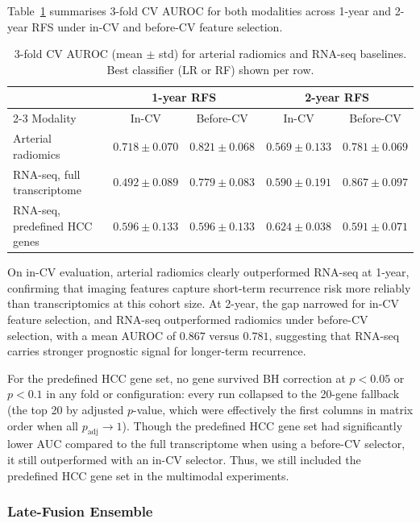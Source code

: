 \documentclass[12pt,twoside]{report}
\begin{document}
Table~\ref{tab:baselines} summarises 3-fold CV AUROC for both modalities across 1-year and 2-year RFS
under in-CV and before-CV feature selection.

\begin{table}[H]
\centering
\small
\caption{3-fold CV AUROC (mean $\pm$ std) for arterial radiomics and RNA-seq baselines. Best classifier (LR or RF) shown per row.}
\label{tab:baselines}
\begin{tabular}{lcccc}
\hline
 & \multicolumn{2}{c}{1-year RFS} & \multicolumn{2}{c}{2-year RFS} \\
\cline{2-3}\cline{4-5}
Modality & In-CV & Before-CV& In-CV & Before-CV \\
\hline
Arterial radiomics             & $0.718 \pm 0.070$ & $0.821 \pm 0.068$ & $0.569 \pm 0.133$ & $0.781 \pm 0.069$ \\
RNA-seq, full transcriptome   & $0.492 \pm 0.089$ & $0.779 \pm 0.083$ & $0.590 \pm 0.191$ & $0.867 \pm 0.097$ \\
RNA-seq, predefined HCC genes   & $0.596 \pm 0.133$ & $0.596 \pm 0.133$ & $0.624 \pm 0.038$ & $0.591 \pm 0.071$ \\
\hline
\end{tabular}
\end{table}

On in-CV evaluation, arterial radiomics clearly outperformed RNA-seq at 1-year, confirming that imaging features capture short-term
recurrence risk more reliably than transcriptomics at this cohort size.
At 2-year, the gap narrowed for in-CV feature selection, and RNA-seq outperformed radiomics under before-CV selection, with a mean AUROC of $0.867$ versus $0.781$, 
suggesting that RNA-seq carries stronger prognostic signal for longer-term recurrence.

For the predefined HCC gene set, no gene survived BH correction at $p < 0.05$ or $p < 0.1$
in any fold or configuration: every run collapsed to the 20-gene fallback
(the top 20 by adjusted $p$-value, which were effectively the first columns in matrix order
when all $p_{\mathrm{adj}} \to 1$).
Though the predefined HCC gene set had significantly lower AUC compared to the full transcriptome when using a before-CV selector, it still outperformed with an in-CV selector.
Thus, we still included the predefined HCC gene set in the multimodal experiments.

\subsubsection*{Late-Fusion Ensemble}
\end{document}

